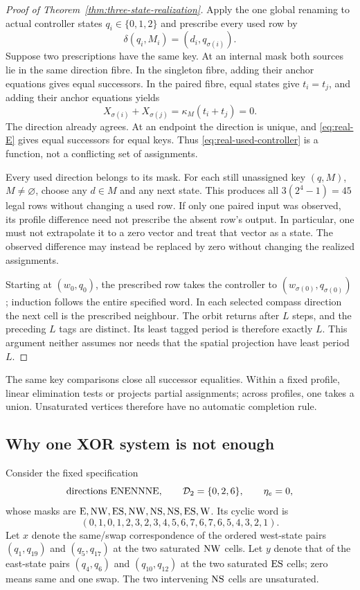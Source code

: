 \begin{proof}[Proof of Theorem~\ref{thm:three-state-realization}]
Apply the one global renaming to actual controller states $q_i\in\{0,1,2\}$ and
prescribe every used row by
\begin{equation}\label{eq:real-used-controller}
 \delta(q_i,M_i)=(d_i,q_{\sigma(i)}).
\end{equation}
Suppose two prescriptions have the same key. At an internal mask both sources lie
in the same direction fibre. In the singleton fibre, adding their anchor equations
gives equal successors. In the paired fibre, equal states give $t_i=t_j$, and
adding their anchor equations yields
\[
 X_{\sigma(i)}+X_{\sigma(j)}=\kappa_M(t_i+t_j)=0.
\]
The direction already agrees. At an endpoint the direction is unique, and
\eqref{eq:real-E} gives equal successors for equal keys. Thus
\eqref{eq:real-used-controller} is a function, not a conflicting set of assignments.

Every used direction belongs to its mask. For each still unassigned key $(q,M)$,
$M\ne\varnothing$, choose any $d\in M$ and any next state. This produces all
$3(2^4-1)=45$ legal rows without changing a used row. If only one paired input was
observed, its profile difference need not prescribe the absent row's output.
In particular, one must not extrapolate it to a zero vector and treat that vector
as a state. The observed difference may instead be replaced by zero without
changing the realized assignments.

Starting at $(w_0,q_0)$, the prescribed row takes the controller to
$(w_{\sigma(0)},q_{\sigma(0)})$; induction follows the entire specified word.
In each selected compass direction the next cell is the prescribed neighbour.
The orbit returns after $L$ steps, and the preceding $L$ tags are distinct.
Its least tagged period is therefore exactly $L$. This argument neither assumes
nor needs that the spatial projection have least period $L$.
\end{proof}

The same key comparisons close all successor equalities. Within a fixed profile,
linear elimination tests or projects partial assignments; across profiles, one takes
a union. Unsaturated vertices therefore have no automatic completion rule.

\subsection{Why one XOR system is not enough}

Consider the fixed specification
\[
 \text{directions }\mathrm{E}\mathrm{N}\mathrm{E}\mathrm{N}\mathrm{N}\mathrm{N}\mathrm{E},\qquad
 \mathcal D_2=\{0,2,6\},\qquad \eta_e=0,
\]
whose masks are $\mathrm{E},\mathrm{N}\mathrm{W},\mathrm{E}\mathrm{S},\mathrm{N}\mathrm{W},\mathrm{N}\mathrm{S},\mathrm{N}\mathrm{S},\mathrm{E}\mathrm{S},\mathrm{W}$.
Its cyclic word is
\[
 (0,1,0,1,2,3,2,3,4,5,6,7,6,7,6,5,4,3,2,1).
\]
Let $x$ denote the same/swap correspondence of the ordered west-state pairs
$(q_1,q_{19})$ and $(q_5,q_{17})$ at the two saturated $\mathrm{N}\mathrm{W}$ cells.
Let $y$ denote that of the east-state pairs $(q_4,q_6)$ and $(q_{10},q_{12})$
at the two saturated $\mathrm{E}\mathrm{S}$ cells; zero means same and one swap.
The two intervening $\mathrm{N}\mathrm{S}$ cells are unsaturated.

